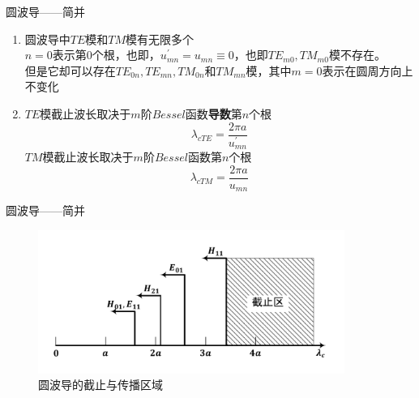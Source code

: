 \begin{frame}{圆波导——简并}
    \begin{enumerate}
        \item 圆波导中$TE$模和$TM$模有无限多个\\
              $n=0$表示第$0$个根，也即，$u_{mn}^{'}=u_{mn}\equiv 0$，也即$TE_{m0},TM_{m0}$模不存在。\\
              但是它却可以存在$TE_{0n},TE_{mn},TM_{0n}和TM_{mn}$模，其中$m=0$表示在圆周方向上不变化
        \item $TE$模截止波长取决于$m$阶$Bessel$函数\textbf{导数}第$n$个根\\
              $$\lambda_{cTE}=\frac{2\pi a}{u_{mn}^{'}}$$
              $TM$模截止波长取决于$m$阶$Bessel$函数第$n$个根\\
              $$\lambda_{cTM}=\frac{2\pi a}{u_{mn}}$$
              \saveenum
    \end{enumerate}
\end{frame}

\begin{frame}{圆波导——简并}
    \begin{figure}
        \includegraphics[width=10cm]{Cha6//fig6-20.pdf}
        \caption{圆波导的截止与传播区域}
    \end{figure}
\end{frame}

